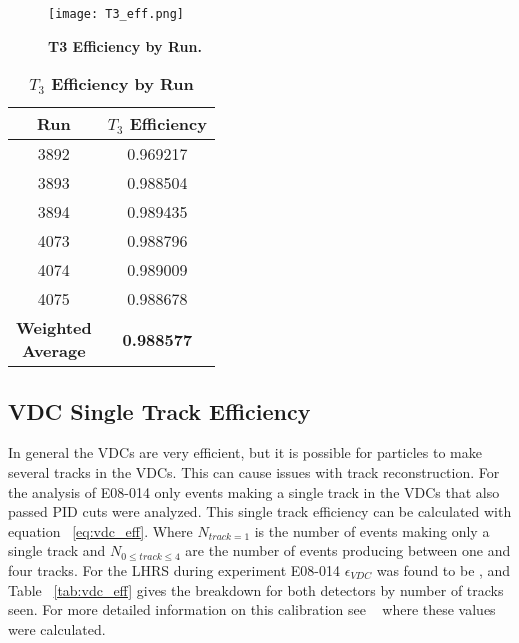 \begin{figure}[!ht]
\begin{center}
\texttt{[image: T3\_eff.png]}
\end{center}
\caption{
{\bf{T3 Efficiency by Run.}} }
\label{fig:t3_eff}
\end{figure}

\begin{table}[!h]
\centering
\begin{tabular}{|c c|}
\hline
\textbf{Run} & \textbf{$T_3$ Efficiency}\\
\hline
3892 & 0.969217\\
3893 & 0.988504\\
3894 & 0.989435\\
4073 & 0.988796\\
4074 & 0.989009\\
4075 & 0.988678\\   
\hline
\makecell{\textbf{Weighted}\\ \textbf{Average}} & \textbf{0.988577} \\
\hline
\end{tabular}
\caption{{\bf{$T_3$ Efficiency by Run}} }
\label{tab:t3_eff}
\end{table}

\subsection{VDC Single Track Efficiency}
\label{ssec:vdc_eff}

In general the VDCs are very efficient, but it is possible for particles to make several tracks in the VDCs. This can cause issues with track reconstruction. For the analysis of E08-014 only events making a single track in the VDCs that also passed PID cuts were analyzed. This single track efficiency can be calculated with equation ~\ref{eq:vdc_eff}. Where $N_{track=1}$ is the number of events making only a single track and $N_{0 \leq track \leq 4}$ are the number of events producing between one and four tracks. For the LHRS during experiment E08-014 $\epsilon_{VDC}$ was found to be , and Table ~\ref{tab:vdc_eff} gives the breakdown for both detectors by number of tracks seen. For more detailed information on this calibration see ~\cite{Thesis:Ye} where these values were calculated. 

